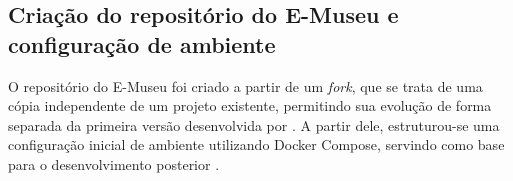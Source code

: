 \subsection{Criação do repositório do E-Museu e configuração de ambiente}

O repositório do E-Museu foi criado a partir de um \textit{fork}, que se trata de uma cópia independente de um projeto existente, permitindo sua evolução de forma separada da primeira versão desenvolvida por \cite{gonzaga2024}. A partir dele, estruturou-se uma configuração inicial de ambiente utilizando Docker Compose, servindo como base para o desenvolvimento posterior \cite{emuseurepo}.
